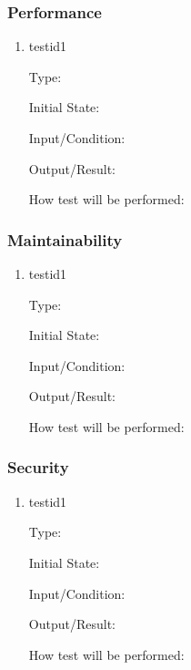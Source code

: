 \documentclass[12pt, titlepage]{article}
\begin{document}
\subsubsection{Performance}

\begin{enumerate}

\item{testid1\\}

Type: 
					
Initial State: 
					
Input/Condition: 
					
Output/Result: 
					
How test will be performed: 

\end{enumerate}

\subsubsection{Maintainability}

\begin{enumerate}

\item{testid1\\}

Type: 
					
Initial State: 
					
Input/Condition: 
					
Output/Result: 
					
How test will be performed: 

\end{enumerate}

\subsubsection{Security}

\begin{enumerate}

\item{testid1\\}

Type: 
					
Initial State: 
					
Input/Condition: 
					
Output/Result: 
					
How test will be performed: 

\end{enumerate}
\end{document}
